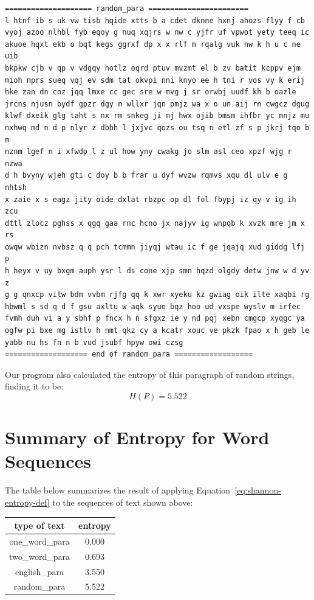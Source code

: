 \documentclass[11pt]{article}
\begin{document}
\begin{tiny}
\begin{verbatim}
==================== random_para =======================
l htnf ib s uk vw tisb hqide xtts b a cdet dknne hxnj ahozs flyy f cb
vyoj azoo nlhbl fyb eqoy g nuq xqjrs w nw c yjfr uf vpwot yety teeq ic
akuoe hqxt ekb o bqt kegs ggrxf dp x x rlf m rqalg vuk nw k h u c ne uib
bkpkw cjb v qp v vdgqy hotlz oqrd ptuv mvzmt el b zv batit kcppv ejm
mioh nprs sueq vqj ev sdm tat okvpi nni knyo ee h tni r vos vy k erij
hke zan dn coz jqq lmxe cc gec sre w mvg j sr orwbj uudf kh b oazle
jrcns njusn bydf gpzr dgy n wllxr jqn pmjz wa x o un aij rn cwgcz dgug
klwf dxeik glg taht s nx rm snkeg ji mj hwx ojib bmsm ihfbr yc mnjz mu
nxhwq md n d p nlyr z dbbh l jxjvc qozs ou tsq n etl zf s p jkrj tqo b m
nznm lgef n i xfwdp l z ul how yny cwakg jo slm asl ceo xpzf wjg r nzwa
d h bvyny wjeh gti c doy b b frar u dyf wvzw rqmvs xqu dl ulv e g nhtsh
x zaie x s eagz jity oide dxlat rbzpc op dl fol fbypj iz qy v ig ih zcu
dttl zlocz pghss x qgq gaa rnc hcno jx najyv ig wnpqb k xvzk mre jm x rs
owqw wbizn nvbsz q q pch tcmmn jiyqj wtau ic f ge jqajq xud giddg lfj p
h heyx v uy bxgm auph ysr l ds cone xjp smn hqzd olgdy detw jnw w d yv z
g g qnxcp vitw bdm vvbm rjfg qq k xwr xyeku kz gwiag oik ilte xaqbi rg
hbwml s sd q d f gsu axltu w aqk syue bqz hoo ud vxspe wyslv m irfec
fvmh duh vi a y sbhf p fncx h n sfgxz ie y nd pqj xebn cmgcp xyqgc ya
ogfw pi bxe mg istlv h nmt qkz cy a kcatr xouc ve pkzk fpao x h geb le
yabb nu hs fn n b vud jsubf hpyw owi czsg
=================== end of random_para ==================
\end{verbatim}
\end{tiny}

Our program also calculated the entropy of this paragraph of random
strings, finding it to be:
$$
H(P) = 5.522
$$




\section{Summary of Entropy for Word Sequences}

The table below summarizes the result of applying
Equation~\ref{eq:shannon-entropy-def} to the sequences of text shown
above:

\begin{center}
\begin{tabular}{ |c|c| }
  \hline
  type of text  &   entropy \\
\hline
one\_word\_para &   0.000 \\
two\_word\_para &   0.693 \\
english\_para  &   3.550 \\
random\_para   &   5.522 \\
\hline
\end{tabular}
\end{center}
\end{document}
